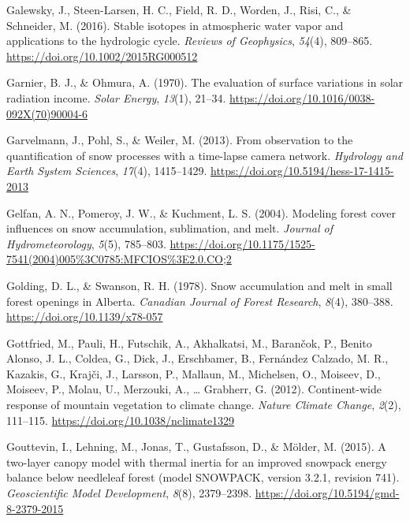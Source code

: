 \documentclass[
  letterpaper,
]{tex/uofsthesis-cs}
\newlength{\cslhangindent}
\newenvironment{CSLReferences}[2] %
 {\begin{list}{}{%
  \setlength{\itemindent}{0pt}
  \setlength{\leftmargin}{0pt}
  \setlength{\parsep}{0pt}
  \ifodd #1
   \setlength{\leftmargin}{\cslhangindent}
   \setlength{\itemindent}{-1\cslhangindent}
  \fi
  \setlength{\itemsep}{#2\baselineskip}}}
 {\end{list}}
\begin{document}
\begin{CSLReferences}{1}{0}
Galewsky, J., Steen-Larsen, H. C., Field, R. D., Worden, J., Risi, C.,
\& Schneider, M. (2016). Stable isotopes in atmospheric water vapor and
applications to the hydrologic cycle. \emph{Reviews of Geophysics},
\emph{54}(4), 809--865. \url{https://doi.org/10.1002/2015RG000512}

Garnier, B. J., \& Ohmura, A. (1970). The evaluation of surface
variations in solar radiation income. \emph{Solar Energy}, \emph{13}(1),
21--34. \url{https://doi.org/10.1016/0038-092X(70)90004-6}

Garvelmann, J., Pohl, S., \& Weiler, M. (2013). From observation to the
quantification of snow processes with a time-lapse camera network.
\emph{Hydrology and Earth System Sciences}, \emph{17}(4), 1415--1429.
\url{https://doi.org/10.5194/hess-17-1415-2013}

Gelfan, A. N., Pomeroy, J. W., \& Kuchment, L. S. (2004). Modeling
forest cover influences on snow accumulation, sublimation, and melt.
\emph{Journal of Hydrometeorology}, \emph{5}(5), 785--803.
\url{https://doi.org/10.1175/1525-7541(2004)005\%3C0785:MFCIOS\%3E2.0.CO;2}

Golding, D. L., \& Swanson, R. H. (1978). Snow accumulation and melt in
small forest openings in {Alberta}. \emph{Canadian Journal of Forest
Research}, \emph{8}(4), 380--388. \url{https://doi.org/10.1139/x78-057}

Gottfried, M., Pauli, H., Futschik, A., Akhalkatsi, M., Barančok, P.,
Benito Alonso, J. L., Coldea, G., Dick, J., Erschbamer, B., Fernández
Calzado, M. R., Kazakis, G., Krajči, J., Larsson, P., Mallaun, M.,
Michelsen, O., Moiseev, D., Moiseev, P., Molau, U., Merzouki, A.,
\ldots{} Grabherr, G. (2012). Continent-wide response of mountain
vegetation to climate change. \emph{Nature Climate Change}, \emph{2}(2),
111--115. \url{https://doi.org/10.1038/nclimate1329}

Gouttevin, I., Lehning, M., Jonas, T., Gustafsson, D., \& Mölder, M.
(2015). A two-layer canopy model with thermal inertia for an improved
snowpack energy balance below needleleaf forest (model {SNOWPACK},
version 3.2.1, revision 741). \emph{Geoscientific Model Development},
\emph{8}(8), 2379--2398. \url{https://doi.org/10.5194/gmd-8-2379-2015}


\end{CSLReferences}
\end{document}
